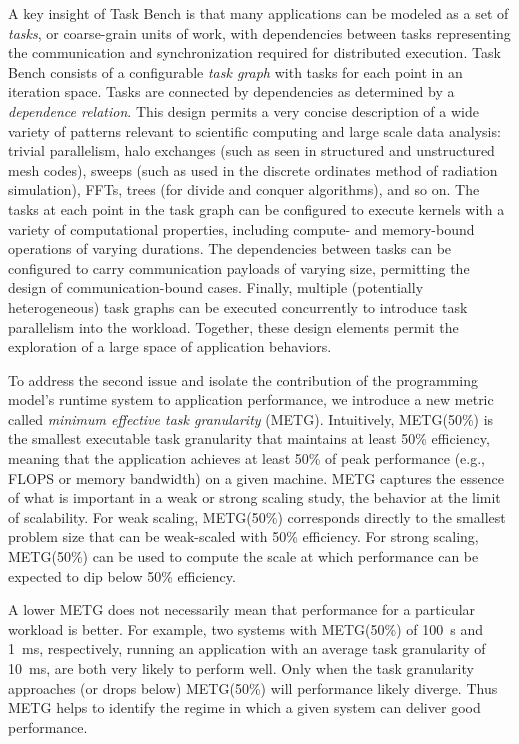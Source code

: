 A key insight of Task Bench is that many applications can be modeled
as a set of \emph{tasks}, or coarse-grain units of work, with
dependencies between tasks representing the communication and synchronization required for
distributed execution. Task Bench consists of a configurable \emph{task graph} with tasks for
each point in an iteration space. Tasks are connected by dependencies
as determined by a \emph{dependence relation}. This design permits a
very concise description of a wide variety of patterns relevant to
scientific computing and large scale data analysis: trivial parallelism, halo exchanges (such as
seen in structured and unstructured mesh codes), sweeps (such as used
in the discrete ordinates method of radiation simulation), FFTs, trees
(for divide and conquer algorithms), and so on. The tasks at each
point in the task graph can be configured to execute kernels with a
variety of computational properties, including compute- and
memory-bound operations of varying durations. The dependencies between
tasks can be configured to carry communication payloads of varying size, permitting
the design of communication-bound cases. Finally, multiple
(potentially heterogeneous) task graphs can be executed concurrently
to introduce task parallelism into the workload. Together, these
design elements permit the exploration of a large space of application
behaviors.

To address the second issue and isolate the contribution of the programming model's runtime system to application performance, we introduce a new metric called \emph{minimum effective task granularity} (METG). Intuitively, METG(50\%) is the smallest executable task granularity that maintains at least 50\% efficiency, meaning that the application achieves at least 50\% of peak
performance (e.g., FLOPS or memory bandwidth) on a given machine. METG captures the essence of what is important in a weak
or strong scaling study, the behavior at the limit of scalability. For
weak scaling, METG(50\%) corresponds directly to the smallest problem size that can be weak-scaled with 50\% efficiency. For strong scaling, METG(50\%) can be used to compute the scale at which performance can be expected to dip below 50\% efficiency.

A lower METG does not necessarily mean that performance for a particular workload is
better. For example, two systems with METG(50\%) of 100~\textmu{}s and 1~ms,
respectively, running an application with an average task granularity
of 10~ms, are both very likely to perform well. Only when the task
granularity approaches (or drops below) METG(50\%) will performance
likely diverge. Thus METG helps to identify the regime in which a
given system can deliver good performance.

